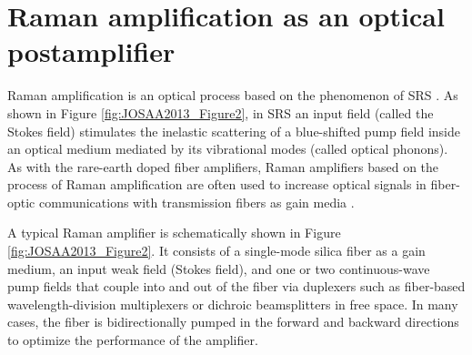 \section{Raman amplification as an optical postamplifier} \label{sec:JOSAA2013_Section2}

Raman amplification is an optical process based on the phenomenon of SRS \cite{agrawal2007nonlinear,islam2002raman}. As shown in Figure \ref{fig:JOSAA2013_Figure2}, in SRS an input field (called the Stokes field) stimulates the inelastic scattering of a blue-shifted pump field inside an optical medium mediated by its vibrational modes (called optical phonons). As with the rare-earth doped fiber amplifiers, Raman amplifiers based on the process of Raman amplification are often used to increase optical signals in fiber-optic communications with transmission fibers as gain media \cite{agrawal2007nonlinear,islam2002raman}.

A typical Raman amplifier is schematically shown in Figure \ref{fig:JOSAA2013_Figure2}. It consists of a single-mode silica fiber as a gain medium, an input weak field (Stokes field), and one or two continuous-wave pump fields that couple into and out of the fiber via duplexers such as fiber-based wavelength-division multiplexers or dichroic beamsplitters in free space. In many cases, the fiber is bidirectionally pumped in the forward and backward directions to optimize the performance of the amplifier.

